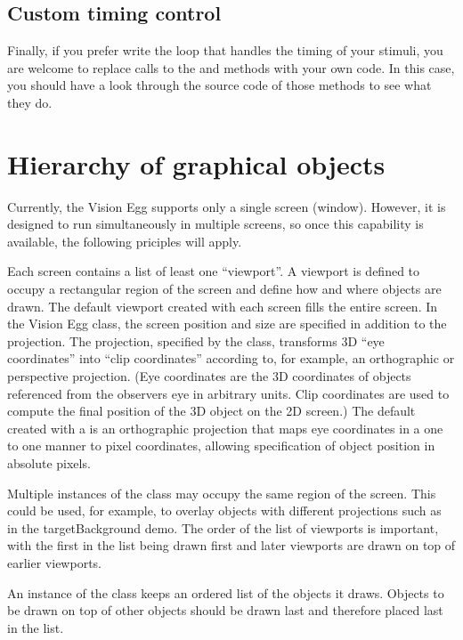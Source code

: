 \documentclass{manual}
\begin{document}
\section{Custom timing control}

Finally, if you prefer write the loop that handles the timing of your
stimuli, you are welcome to replace calls to the  and
 methods with your own code.  In this case, you
should have a look through the source code of those methods to see
what they do.

\chapter{Hierarchy of graphical objects \label{hierarchy}}

Currently, the Vision Egg supports only a single screen (window).
However, it is designed to run simultaneously in multiple screens, so
once this capability is available, the following priciples will apply.

Each screen contains a list of least one ``viewport''. A viewport is
defined to occupy a rectangular region of the screen and define how
and where objects are drawn. The default viewport created with each
screen fills the entire screen. In the Vision Egg 
class, the screen position and size are specified in addition to the
projection.  The projection, specified by the 
class, transforms 3D ``eye coordinates'' into ``clip coordinates''
according to, for example, an orthographic or perspective projection.
(Eye coordinates are the 3D coordinates of objects referenced from the
observers eye in arbitrary units.  Clip coordinates are used to
compute the final position of the 3D object on the 2D screen.)  The
default  created with a  is an
orthographic projection that maps eye coordinates in a one to one
manner to pixel coordinates, allowing specification of object position
in absolute pixels.

Multiple instances of the  class may occupy the same
region of the screen.  This could be used, for example, to overlay
objects with different projections such as in the targetBackground
demo.  The order of the list of viewports is important, with the first
in the list being drawn first and later viewports are drawn on top of
earlier viewports.

An instance of the  class keeps an ordered list of the
objects it draws.  Objects to be drawn on top of other objects should
be drawn last and therefore placed last in the list.
\end{document}
